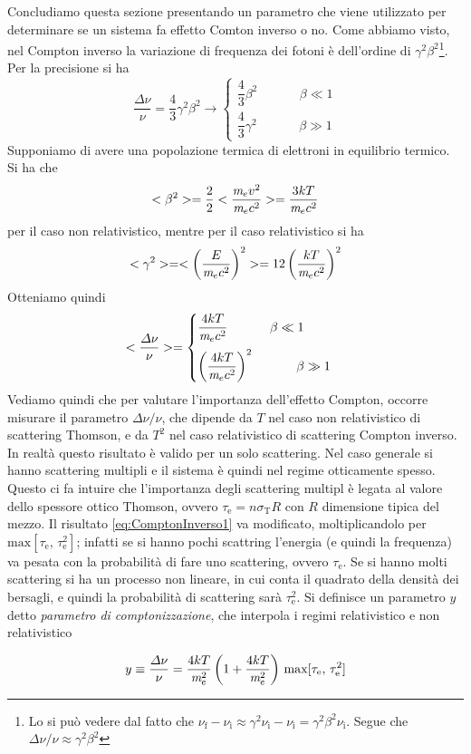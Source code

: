 Concludiamo questa sezione presentando un parametro che viene utilizzato per determinare se un sistema fa effetto Comton inverso o no. Come abbiamo visto, nel Compton inverso la variazione di frequenza dei fotoni è dell'ordine di $\gamma^2\beta^2$\footnote{Lo si può vedere dal fatto che $\nu_\mathrm{f}-\nu_\mathrm{i} \approx \gamma^2\nu_\mathrm{i}-\nu_\mathrm{i} = \gamma^2\beta^2\nu_\mathrm{i}$. Segue che $\Delta\nu/\nu \approx \gamma^2\beta^2$}. Per la precisione si ha
\begin{equation}
\dfrac{\Delta\nu}{\nu} = \dfrac{4}{3}\gamma^2\beta^2 \to 
\begin{cases}
\dfrac{4}{3}\beta^2 \,\,\,\,\,\,\,\,\,\,\,\,\,\,\,\,\,\,\,\,\beta\ll 1\\[10pt]
\dfrac{4}{3}\gamma^2 \,\,\,\,\,\,\,\,\,\,\,\,\,\,\,\,\,\,\,\,\beta\gg 1
\end{cases}
\end{equation}
Supponiamo di avere una popolazione termica di elettroni in equilibrio termico. Si ha che 
\begin{equation}
<\beta^2> = \dfrac{2}{2}<\dfrac{\textit{m}_{e} v^2}{\textit{m}_{e} c^2}> = \dfrac{3kT}{\textit{m}_{e} c^2}
\end{equation}
per il caso non relativistico, mentre per il caso relativistico si ha
\begin{equation}
<\gamma^2 > = <\left( \dfrac{E}{\textit{m}_{e} c^2} \right)^2> = 12 \left( \dfrac{kT}{\textit{m}_{e} c^2} \right)^2
\end{equation}
Otteniamo quindi
\begin{equation}
<\dfrac{\Delta\nu}{\nu}> = 
\begin{cases}
\dfrac{4kT}{\textit{m}_{e} c^2} \,\,\,\,\,\,\,\,\,\,\,\,\,\,\,\,\,\,\,\,\beta\ll 1\\[10pt]
\left( \dfrac{4kT}{\textit{m}_{e} c^2} \right)^2 \,\,\,\,\,\,\,\,\,\,\,\,\,\,\,\,\,\,\,\,\beta\gg 1
\end{cases}\label{eq:ComptonInverso1}
\end{equation}
Vediamo quindi che per valutare l'importanza dell'effetto Compton, occorre misurare il parametro $\Delta\nu/\nu$, che dipende da $T$ nel caso non relativistico di scattering Thomson, e da $T^2$ nel caso relativistico di scattering Compton inverso. In realtà questo risultato è valido per un solo scattering. Nel caso generale si hanno scattering multipli e il sistema è quindi nel regime otticamente spesso. Questo ci fa intuire che l'importanza degli scattering multipl è legata al valore dello spessore ottico Thomson, ovvero $\tau_\mathrm{e}=n\sigma_\mathrm{T} R$ con $R$ dimensione tipica del mezzo. Il risultato \ref{eq:ComptonInverso1} va modificato, moltiplicandolo per $\mathrm{max}[\tau_\mathrm{e}, \,\tau_\mathrm{e}^2]$; infatti se si hanno pochi scattring l'energia (e quindi la frequenza) va pesata con la probabilità di fare uno scattering, ovvero $\tau_\mathrm{e}$. Se si hanno molti scattering si ha un processo non lineare, in cui conta il quadrato della densità dei bersagli, e quindi la probabilità di scattering sarà $\tau_\mathrm{e}^2$. Si definisce un parametro $y$ detto \textit{parametro di comptonizzazione}, che interpola i regimi relativistico e non relativistico
\begin{EQ}
\begin{equation}
y \equiv \dfrac{\Delta\nu}{\nu} =  \dfrac{4kT}{\textit{m}_{e}^2}\left( 1+\dfrac{4kT}{\textit{m}_{e}^2} \right)\,\mathrm{max}[\tau_\mathrm{e}, \,\tau_\mathrm{e}^2]
\end{equation}
\end{EQ}